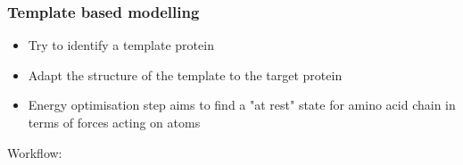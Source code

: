 \documentclass[a4paper]{article}
\begin{document}
\subsubsection{Template based modelling}

\begin{itemize}
  \item
    Try to identify a template protein

  \item
    Adapt the structure of the template to the target protein

  \item
    Energy optimisation step aims to find a "at rest" state for amino acid chain
    in terms of forces acting on atoms
\end{itemize}

Workflow:
\end{document}
